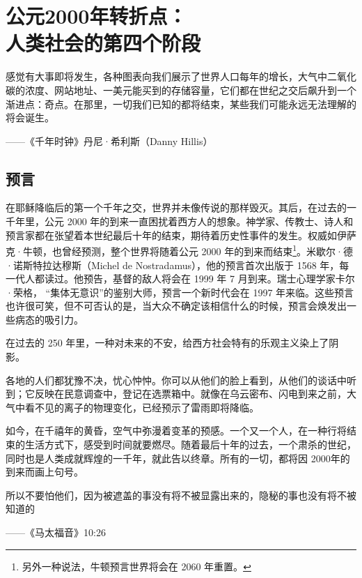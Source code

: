 \chapter[公元2000年转折点]{公元2000年转折点：\\ 人类社会的第四个阶段}

\begin{tcolorbox}
感觉有大事即将发生，各种图表向我们展示了世界人口每年的增长，大气中二氧化碳的浓度、网站地址、一美元能买到的存储容量，它们都在世纪之交后飙升到一个渐进点：奇点。在那里，一切我们已知的都将结束，某些我们可能永远无法理解的将会诞生。

\begin{flushright}
——《千年时钟》丹尼·希利斯（Danny Hillis）
\end{flushright}

\end{tcolorbox}


\section{预言}
在耶稣降临后的第一个千年之交，世界并未像传说的那样毁灭。其后，在过去的一千年里，公元 2000 年的到来一直困扰着西方人的想象。神学家、传教士、诗人和预言家都在张望着本世纪最后十年的结束，期待着历史性事件的发生。权威如伊萨克·牛顿，也曾经预测，整个世界将随着公元 2000 年的到来而结束\footnote{另外一种说法，牛顿预言世界将会在 2060 年重置。}。米歇尔·德·诺斯特拉达穆斯（Michel de Nostradamus），他的预言首次出版于 1568 年，每一代人都读过。他预告，基督的敌人将会在 1999 年 7 月到来。瑞士心理学家卡尔·荣格， “集体无意识”的鉴别大师，预言一个新时代会在 1997 年来临。这些预言也许很可笑，但不可否认的是，当大众不确定该相信什么的时候，预言会焕发出一些病态的吸引力。


在过去的 250 年里，一种对未来的不安，给西方社会特有的乐观主义染上了阴影。

各地的人们都犹豫不决，忧心忡忡。你可以从他们的脸上看到，从他们的谈话中听到；它反映在民意调查中，登记在选票箱中。就像在乌云密布、闪电到来之前，大气中看不见的离子的物理变化，已经预示了雷雨即将降临。

如今，在千禧年的黄昏，空气中弥漫着变革的预感。一个又一个人，在一种行将结束的生活方式下，感受到时间就要燃尽。随着最后十年的过去，一个肃杀的世纪，同时也是人类成就辉煌的一千年，就此告以终章。所有的一切，都将因 2000年的到来而画上句号。



\begin{tcolorbox}
所以不要怕他们，因为被遮盖的事没有将不被显露出来的，隐秘的事也没有将不被知道的
\begin{flushright}
——《马太福音》10:26
\end{flushright}
\end{tcolorbox}


